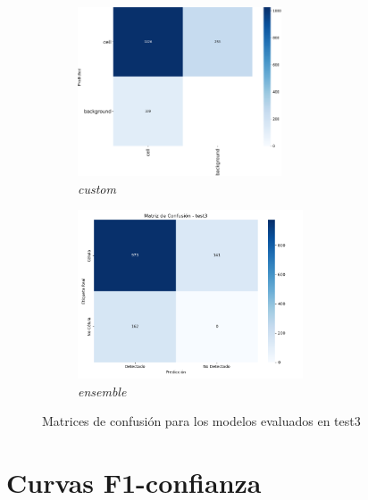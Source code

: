 \documentclass[12pt,a4paper,onecolumn,oneside]{report}
\begin{document}
\begin{figure}[H]
  \vspace{0.1cm}
  \begin{subfigure}[b]{0.45\textwidth}
    \centering
    \includegraphics[height=5cm]{figuras/resultados experimentacion/custom/test3/confusion_matrix.png}
    \vspace{-0.3cm}
    \caption{\footnotesize \textit{custom}}
    \label{fig:confusion_custom_test3}
  \end{subfigure}
  \hfill
  \begin{subfigure}[b]{0.45\textwidth}
    \centering
    \includegraphics[height=5cm]{figuras/resultados experimentacion/ensemble/confusion_matrices/confusion_matrix_test3.png}
    \vspace{-0.3cm}
    \caption{\footnotesize \textit{ensemble}}
    \label{fig:confusion_ensemble_test3}
  \end{subfigure}
  
  \vspace{-0.2cm}
  \caption{Matrices de confusión para los modelos evaluados en test3}
  \label{fig:confusion_matrices_test3}
\end{figure}

\section{Curvas F1-confianza}
\label{sec:Curvas F1-confianza}
\end{document}
